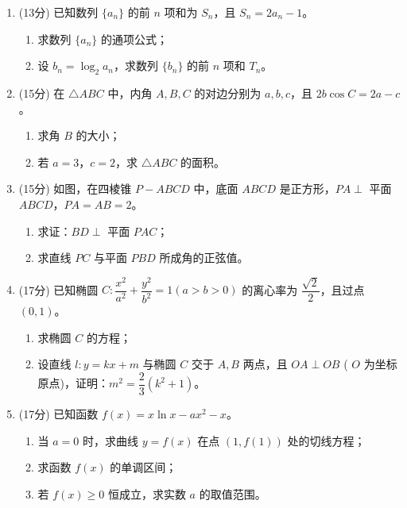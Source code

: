 \documentclass[12pt,a4paper]{article}
\begin{document}
	\begin{enumerate}[resume]
		\item (13分) 已知数列 \( \{a_n\} \) 的前 \( n \) 项和为 \( S_n \)，且 \( S_n = 2a_n - 1 \)。
		\begin{enumerate}
			\item 求数列 \( \{a_n\} \) 的通项公式；
			\item 设 \( b_n = \log_2 a_n \)，求数列 \( \{b_n\} \) 的前 \( n \) 项和 \( T_n \)。
		\end{enumerate}

		\item (15分) 在 \( \triangle ABC \) 中，内角 \( A, B, C \) 的对边分别为 \( a, b, c \)，且 \( 2b\cos C = 2a - c \)。
		\begin{enumerate}
			\item 求角 \( B \) 的大小；
			\item 若 \( a = 3 \)，\( c = 2 \)，求 \( \triangle ABC \) 的面积。
		\end{enumerate}

		\item (15分) 如图，在四棱锥 \( P-ABCD \) 中，底面 \( ABCD \) 是正方形，\( PA \perp \) 平面 \( ABCD \)，\( PA = AB = 2 \)。
		\begin{enumerate}
			\item 求证：\( BD \perp \) 平面 \( PAC \)；
			\item 求直线 \( PC \) 与平面 \( PBD \) 所成角的正弦值。
		\end{enumerate}

		\item (17分) 已知椭圆 \( C: \dfrac{x^2}{a^2} + \dfrac{y^2}{b^2} = 1 (a > b > 0) \) 的离心率为 \( \dfrac{\sqrt{2}}{2} \)，且过点 \( (0, 1) \)。
		\begin{enumerate}
			\item 求椭圆 \( C \) 的方程；
			\item 设直线 \( l: y = kx + m \) 与椭圆 \( C \) 交于 \( A, B \) 两点，且 \( OA \perp OB \) ( \( O \) 为坐标原点)，证明：\( m^2 = \dfrac{2}{3}(k^2 + 1) \)。
		\end{enumerate}

		\item (17分) 已知函数 \( f(x) = x \ln x - ax^2 - x \)。
		\begin{enumerate}
			\item 当 \( a = 0 \) 时，求曲线 \( y = f(x) \) 在点 \( (1, f(1)) \) 处的切线方程；
			\item 求函数 \( f(x) \) 的单调区间；
			\item 若 \( f(x) \geq 0 \) 恒成立，求实数 \( a \) 的取值范围。
		\end{enumerate}
	\end{enumerate}
\end{document}
